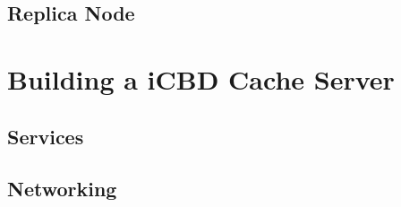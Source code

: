 \subsection{Replica Node}
\label{sub:rep_replica_node}




\section{Building a iCBD Cache Server}
\label{sec:cache_server}

\subsection{Services}
\label{sub:cache_services}

\subsection{Networking}
\label{sub:cache_networking}


